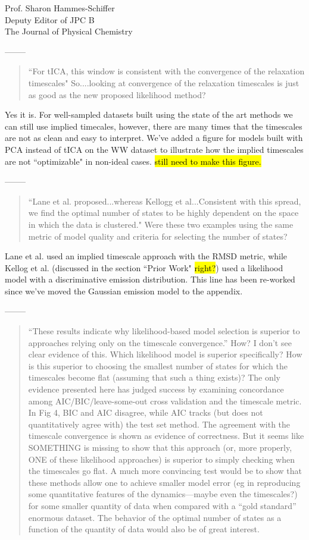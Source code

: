 \documentclass{letter}
\newcommand{\separate}{\begin{center}--------\end{center}}
\begin{document}
\begin{letter}{Prof. Sharon Hammes-Schiffer \\ Deputy Editor of JPC B \\ The Journal of Physical Chemistry}
\separate
\begin{quote}
``For tICA, this window is consistent with the convergence of the relaxation timescales"  So....looking at convergence of the relaxation timescales is just as good as the new proposed likelihood method?
\end{quote}

Yes it is. For well-sampled datasets built using the state of the art methods we can still use implied timecales, however, there are many times that the timescales are not as clean and easy to interpret. We've added a figure for models built with PCA instead of tICA on the WW dataset to illustrate how the implied timescales are not ``optimizable" in non-ideal cases. \hl{still need to make this figure.}

\separate
\begin{quote}
``Lane et al. proposed...whereas Kellogg et al...Consistent with this spread, we find the optimal number of states to be highly dependent on the space in which the data is clustered."  Were these two examples using the same metric of model quality and criteria for selecting the number of states?
\end{quote}
Lane et al. used an implied timescale approach with the RMSD metric, while Kellog et al. (discussed in the section ``Prior Work" \hl{right?}) used a likelihood model with a discriminative emission distribution. This line has been re-worked since we've moved the Gaussian emission model to the appendix.

\separate
\begin{quote}
``These results indicate why likelihood-based model selection is superior to approaches relying only on the timescale convergence.''  How?  I don't see clear evidence of this.  Which likelihood model is superior specifically?  How is this superior to choosing the smallest number of states for which the timescales become flat (assuming that such a thing exists)?  The only evidence presented here has judged success by examining concordance among AIC/BIC/leave-some-out cross validation and the timescale metric.  In Fig 4, BIC and AIC disagree, while AIC tracks (but does not quantitatively agree with) the test set method.  The agreement with the timescale convergence is shown as evidence of correctness.  But it seems like SOMETHING is missing to show that this approach (or, more properly, ONE of these likelihood approaches) is superior to simply checking when the timescales go flat.  A much more convincing test would be to show that these methods allow one to achieve smaller model error (eg in reproducing some quantitative features of the dynamics---maybe even the timescales?) for some smaller quantity of data when compared with a ``gold standard'' enormous dataset.  The behavior of the optimal number of states as a function of the quantity of data would also be of great interest.
\end{quote}


\end{letter}
\end{document}
